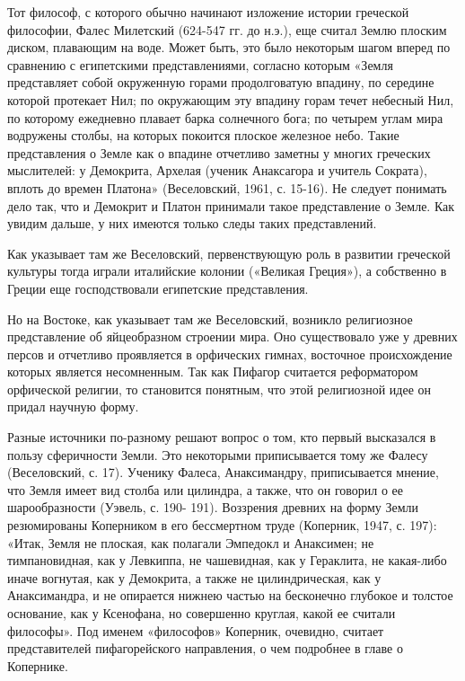 Тот философ, с которого обычно начинают изложение истории греческой
философии, Фалес Милетский (624-547 гг. до н.э.), еще считал Землю
плоским диском, плавающим на воде. Может быть, это было некоторым
шагом вперед по сравнению с египетскими представлениями, согласно
которым «Земля представляет собой окруженную горами продолговатую
впадину, по середине которой протекает Нил; по окружающим эту впадину
горам течет небесный Нил, по которому ежедневно плавает барка
солнечного бога; по четырем углам мира водружены столбы, на которых
покоится плоское железное небо. Такие представления о Земле как о
впадине отчетливо заметны у многих греческих мыслителей: у Демокрита,
Архелая (ученик Анаксагора и учитель Сократа), вплоть до времен
Платона» (Веселовский, 1961, с. 15-16). Не следует понимать дело так,
что и Демокрит и Платон принимали такое представление о Земле. Как
увидим дальше, у них имеются только следы таких представлений.

Как указывает там же Веселовский, первенствующую роль в развитии
греческой культуры тогда играли италийские колонии («Великая Греция»),
а собственно в Греции еще господствовали египетские представления.

Но на Востоке, как указывает там же Веселовский, возникло религиозное
представление об яйцеобразном строении мира. Оно существовало уже у
древних персов и отчетливо проявляется в орфических гимнах, восточное
происхождение которых является несомненным. Так как Пифагор считается
реформатором орфической религии, то становится понятным, что этой
религиозной идее он придал научную форму.

Разные источники по-разному решают вопрос о том, кто первый высказался
в пользу сферичности Земли. Это некоторыми приписывается тому же
Фалесу (Веселовский, с. 17). Ученику Фалеса, Анаксимандру,
приписывается мнение, что Земля имеет вид столба или цилиндра, а
также, что он говорил о ее шарообразности (Уэвель, с. 190- 191).
Воззрения древних на форму Земли резюмированы Коперником в его
бессмертном труде (Коперник, 1947, с. 197): «Итак, Земля не плоская,
как полагали Эмпедокл и Анаксимен; не тимпановидная, как у Левкиппа,
не чашевидная, как у Гераклита, не какая-либо иначе вогнутая, как у
Демокрита, а также не цилиндрическая, как у Анаксимандра, и не
опирается нижнею частью на бесконечно глубокое и толстое основание,
как у Ксенофана, но совершенно круглая, какой ее считали философы».
Под именем «философов» Коперник, очевидно, считает представителей
пифагорейского направления, о чем подробнее в главе о Копернике.

